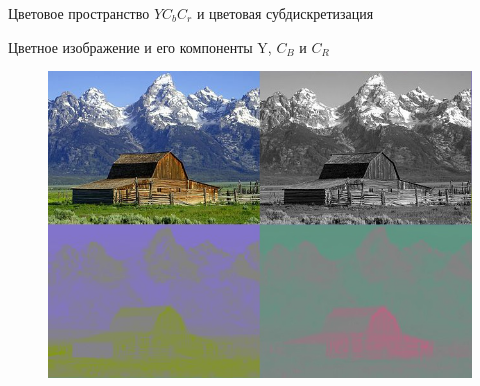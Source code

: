 \documentclass[11pt]{beamer}
\begin{document}
\begin{frame}{Цветовое пространство $YC_bC_r$ и цветовая субдискретизация}
\begin{block}{Цветное изображение и его компоненты Y, $C_B$ и $C_R$}
\begin{figure}[H]
	\begin{center}
		\includegraphics[scale=0.77]{../pics/YCbCr/YCbCr_separation_vert.jpg}
	\end{center}
\end{figure}
\end{block}
\end{frame}
\end{document}
